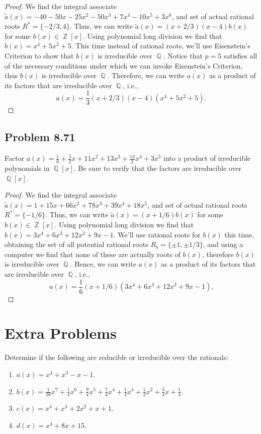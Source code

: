 \documentclass[letterpaper, 12pt]{amsart}
\DeclareMathOperator{\Z}{\mathbb{Z}}
\DeclareMathOperator{\Q}{\mathbb{Q}}
\begin{document}
		\begin{proof}
		We find the integral associate $\tilde{a}(x) = -40 - 50x - 25x^{2} - 50x^{3} + 7x^{4} - 10x^{5} + 3x^{6}$, and set of actual rational roots $R^{*} = \{ -2/3, 4 \}$.
		Thus, we can write $\tilde{a}(x) = (x + 2/3)(x - 4)b(x)$ for some $b(x) \in \Z[x]$.
		Using polynomial long division we find that $b(x) = x^{4} + 5x^{2} + 5$.
		This time instead of rational roots, we'll use Eisenstein's Criterion to show that $b(x)$ is irreducible over $\Q$.
		Notice that $p = 5$ satisfies all of the necessary conditions under which we can invoke Eisenstein's Criterion, thus $b(x)$ is irreducible over $\Q$.
		Therefore, we can write $a(x)$ as a product of its factors that are irreducible over $\Q$, i.e., $$a(x) = \frac{1}{3} (x + 2/3)(x - 4)(x^{4} + 5x^{2} + 5).$$
		\end{proof}

		\subsection*{Problem 8.71}
		\label{sub:problem_8_71}
		Factor $a(x) = \frac{1}{6} + \frac{5}{2}x + 11x^{2} + 13x^{3} + \frac{13}{2}x^{4} + 3x^{5}$ into a product of irreducible polynomials in $\Q[x]$.
		Be sure to verify that the factors are irreducible over $\Q[x]$.

		\begin{proof}
		We find the integral associate $\tilde{a}(x) = 1 + 15x + 66x^{2} + 78x^{3} + 39x^{4} + 18x^{5}$, and set of actual rational roots $R^{*} = \{ -1/6 \}$.
		Thus, we can write $\tilde{a}(x) = (x + 1/6)b(x)$ for some $b(x) \in \Z[x]$.
		Using polynomial long division we find that $b(x) = 3x^{4} + 6x^{3} + 12x^{2} + 9x - 1$.
		We'll use rational roots for $b(x)$ this time, obtaining the set of all potential rational roots $R_{b} = \{ \pm 1, \pm 1/3 \}$, and using a computer we find that none of these are actually roots of $b(x)$, therefore $b(x)$ is irreducible over $\Q$.
		Hence, we can write $a(x)$ as a product of its factors that are irreducible over $\Q$, i.e., $$a(x) = \frac{1}{6} (x + 1/6)(3x^{4} + 6x^{3} + 12x^{2} + 9x - 1).$$
		\end{proof}

	\section{Extra Problems}
	\label{sec:extra_problems}
	Determine if the following are reducible or irreducible over the rationals:
		\begin{enumerate}[1)]
			\item $a(x) = x^{4} + x^{3} - x - 1$.
			\item $b(x) = \frac{1}{28}x^{7} + \frac{1}{4}x^{6} + \frac{9}{4}x^{5} + \frac{7}{4}x^{4} + \frac{1}{4}x^{4} + \frac{1}{2}x^{2} + \frac{3}{4}x + \frac{1}{4}$.
			\item $c(x) = x^{4} + x^{3} + 2x^{2} + x + 1$.
			\item $d(x) = x^{4} + 8x + 15$.
		\end{enumerate}
\end{document}
